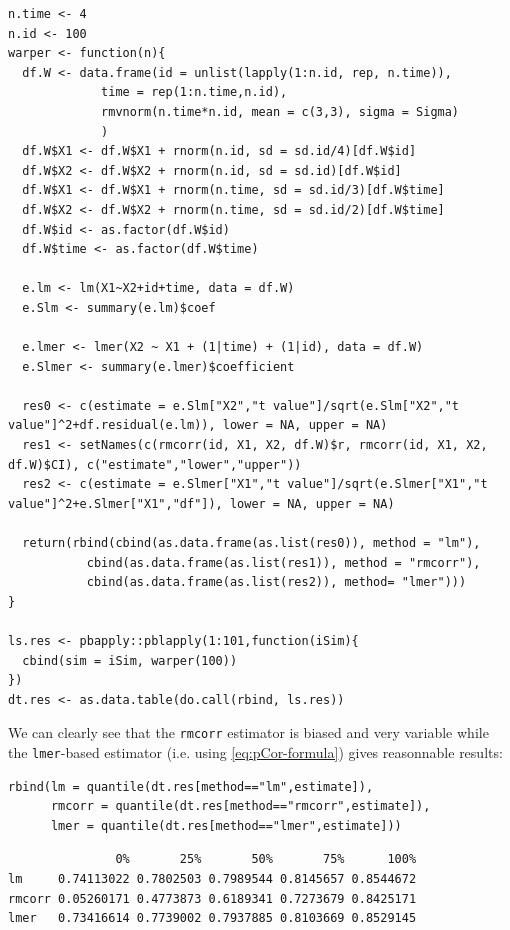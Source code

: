 \documentclass[12pt]{article}
\begin{document}
\lstset{language=r,label= ,caption= ,captionpos=b,numbers=none}
\begin{lstlisting}
n.time <- 4
n.id <- 100
warper <- function(n){
  df.W <- data.frame(id = unlist(lapply(1:n.id, rep, n.time)),
		     time = rep(1:n.time,n.id),
		     rmvnorm(n.time*n.id, mean = c(3,3), sigma = Sigma)
		     )
  df.W$X1 <- df.W$X1 + rnorm(n.id, sd = sd.id/4)[df.W$id]
  df.W$X2 <- df.W$X2 + rnorm(n.id, sd = sd.id)[df.W$id]
  df.W$X1 <- df.W$X1 + rnorm(n.time, sd = sd.id/3)[df.W$time]
  df.W$X2 <- df.W$X2 + rnorm(n.time, sd = sd.id/2)[df.W$time]
  df.W$id <- as.factor(df.W$id)
  df.W$time <- as.factor(df.W$time)

  e.lm <- lm(X1~X2+id+time, data = df.W)
  e.Slm <- summary(e.lm)$coef

  e.lmer <- lmer(X2 ~ X1 + (1|time) + (1|id), data = df.W)
  e.Slmer <- summary(e.lmer)$coefficient

  res0 <- c(estimate = e.Slm["X2","t value"]/sqrt(e.Slm["X2","t value"]^2+df.residual(e.lm)), lower = NA, upper = NA)
  res1 <- setNames(c(rmcorr(id, X1, X2, df.W)$r, rmcorr(id, X1, X2, df.W)$CI), c("estimate","lower","upper"))
  res2 <- c(estimate = e.Slmer["X1","t value"]/sqrt(e.Slmer["X1","t value"]^2+e.Slmer["X1","df"]), lower = NA, upper = NA)

  return(rbind(cbind(as.data.frame(as.list(res0)), method = "lm"),
	       cbind(as.data.frame(as.list(res1)), method = "rmcorr"),
	       cbind(as.data.frame(as.list(res2)), method= "lmer")))
}

ls.res <- pbapply::pblapply(1:101,function(iSim){
  cbind(sim = iSim, warper(100))
})
dt.res <- as.data.table(do.call(rbind, ls.res))
\end{lstlisting}

We can clearly see that the \texttt{rmcorr} estimator is biased and very
variable while the \texttt{lmer}-based estimator (i.e. using
\autoref{eq:pCor-formula}) gives reasonnable results:
\lstset{language=r,label= ,caption= ,captionpos=b,numbers=none}
\begin{lstlisting}
rbind(lm = quantile(dt.res[method=="lm",estimate]),
      rmcorr = quantile(dt.res[method=="rmcorr",estimate]),
      lmer = quantile(dt.res[method=="lmer",estimate]))
\end{lstlisting}

\begin{verbatim}
               0%       25%       50%       75%      100%
lm     0.74113022 0.7802503 0.7989544 0.8145657 0.8544672
rmcorr 0.05260171 0.4773873 0.6189341 0.7273679 0.8425171
lmer   0.73416614 0.7739002 0.7937885 0.8103669 0.8529145
\end{verbatim}
\end{document}
